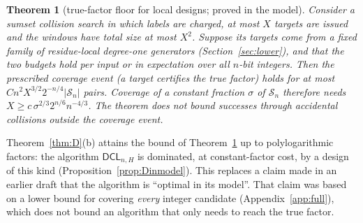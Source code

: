 \documentclass[11pt]{amsart}
\newtheorem{theorem}{Theorem}[section]
\theoremstyle{definition}
\newcommand{\Sn}{\mathcal{S}_n}
\newcommand{\DCL}{\textsf{DCL}}
\begin{document}
\begin{theorem}[true-factor floor for local designs; proved in the model]\label{thm:T1}
Consider a sumset collision search in which labels are charged, at most $X$ targets are issued
and the windows have total size at most $X^2$. Suppose its targets come from a fixed family of residue-local degree-one generators
(Section~\ref{sec:lower}), and that the two budgets hold per input or in expectation over all
$n$-bit integers. Then the prescribed coverage event (a target certifies the true factor) holds
for at most $Cn^2X^{3/2}2^{-n/4}|\Sn|$ pairs. Coverage of a constant fraction $\sigma$ of $\Sn$ therefore needs
$X\ge c\,\sigma^{2/3}2^{n/6}n^{-4/3}$. The theorem does not bound successes through
accidental collisions outside the coverage event.
\end{theorem}

Theorem~\ref{thm:D}(b) attains the bound of Theorem~\ref{thm:T1} up to polylogarithmic factors:
the algorithm $\DCL_{n,H}$ is dominated, at constant-factor cost, by a design of this kind
(Proposition~\ref{prop:Dinmodel}). This replaces a claim made in an earlier draft that the
algorithm is ``optimal in its model''. That claim was based on a lower bound for covering
\emph{every} integer candidate (Appendix~\ref{app:full}), which does not bound an algorithm that
only needs to reach the true factor.
\end{document}
